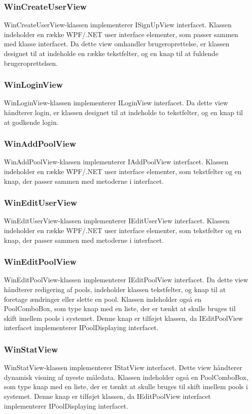 \subsubsection{WinCreateUserView}
WinCreateUserView-klassen implementerer ISignUpView interfacet. Klassen indeholder en række WPF/.NET user interface elementer, som passer sammen med klasse interfacet. Da dette view omhandler brugeroprettelse, er klassen designet til at indeholde en række tekstfelter, og en knap til at fuldende brugeroprettelsen. 

\subsubsection{WinLoginView}
WinLoginView-klassen implementerer ILoginView interfacet. Da dette view håndterer login, er klassen designet til at indeholde to tekstfelter, og en knap til at godkende login.

\subsubsection{WinAddPoolView}
WinAddPoolView-klassen implementerer IAddPoolView interfacet. Klassen indeholder en række WPF/.NET user interface elementer, som tekstfelter og en knap, der passer sammen med metoderne i interfacet. 

\subsubsection{WinEditUserView}
WinEditUserView-klassen implementerer IEditUserView interfacet. Klassen indeholder en række WPF/.NET user interface elementer, som tekstfelter og en knap, der passer sammen med metoderne i interfacet.

\subsubsection{WinEditPoolView}
WinEditPoolView-klassen implementerer IEditPoolView interfacet. Da dette view håndterer redigering af pools, indeholder klassen tekstfelter, og knap til at foretage ændringer eller slette en pool. 
Klassen indeholder også en PoolComboBox, som type knap med en liste, der er tænkt at skulle bruges til skift imellem pools i systemet. Denne knap er tilføjet klassen, da IEditPoolView interfacet implementerer IPoolDisplaying interfacet.

\subsubsection{WinStatView}
WinStatView-klassen implementerer IStatView interfacet. Dette view håndterer dynamisk visning af nyeste måledata.
Klassen indeholder også en PoolComboBox, som type knap med en liste, der er tænkt at skulle bruges til skift imellem pools i systemet. Denne knap er tilføjet klassen, da IEditPoolView interfacet implementerer IPoolDisplaying interfacet.


